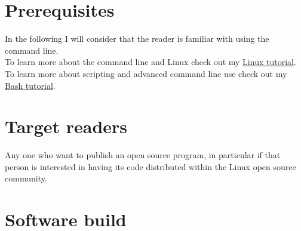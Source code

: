 \documentclass{./these-seb}
\begin{document}
\section{Prerequisites}

In the following I will consider that the reader is familiar with using the command line. \\
To learn more about the command line and Linux check out my \href{https://www.ipcms.fr/wp-content/uploads/2021/11/linux.pdf}{Linux tutorial}. \\
To learn more about scripting and advanced command line use check out my \href{https://www.ipcms.fr/wp-content/uploads/2021/05/bash.pdf}{Bash tutorial}. 

\section{Target readers}

Any one who want to publish an open source program, in particular if that person is interested in having its code distributed within the Linux open source community. 

\section{Software build}
\end{document}
